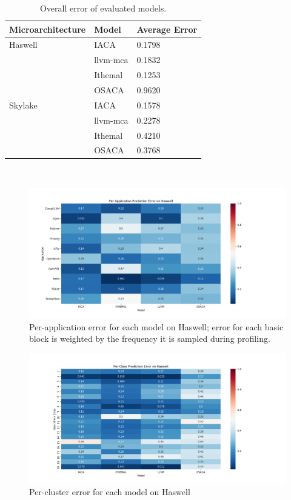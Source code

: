 \begin{table}
\begin{tabular}{|p{}|p{}|p{}|}
\hline

Microarchitecture & Model & Average Error\\
\hline

Haswell & IACA & 0.1798\\
    & llvm-mca & 0.1832\\
    & Ithemal & 0.1253\\
    & OSACA & 0.9620\\
    
\hline 
Skylake & IACA & 0.1578\\
    & llvm-mca & 0.2278\\
    & Ithemal & 0.4210\\
    & OSACA & 0.3768\\

\hline
\end{tabular}
\\
\caption{Overall error of evaluated models.}
\label{tab:overall}
\end{table}

\begin{figure}
\includegraphics[width=\columnwidth]{figures/hsw-app-err.png}
\caption{Per-application error for each model on Haswell;
error for each basic block is weighted by the frequency it is sampled during profiling.}
\label{fig:hsw-app-err}
\end{figure}

\begin{figure}
\includegraphics[width=\columnwidth]{figures/hsw-cluster-err.png}
\caption{Per-cluster error for each model on Haswell}
\label{fig:hsw-cluster-err}
\end{figure}

